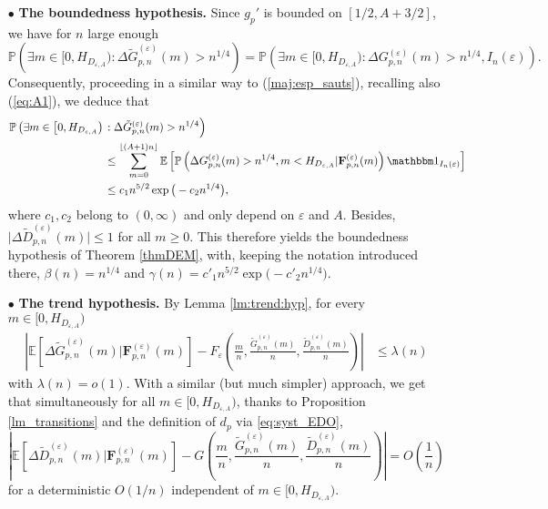 \documentclass[a4, 11pt]{article}
\numberwithin{equation}{section}
\theoremstyle{plain}
\theoremstyle{definition}
\theoremstyle{remark}
\begin{document}
	\begin{enumerate}[leftmargin=0.8cm, topsep=0cm]
			\item[$\bullet$] \textbf{The boundedness hypothesis.}
			Since $g_p'$ is bounded on $\left[1/2,A+3/2\right]$, we have for $n$ large enough
	\begin{equation*}
		\mathbb{P}\left(\exists m \in \big[0,H_{D_{\varepsilon,A}}\big):\Delta \tilde{G}^{(\varepsilon)}_{p,n}(m)>n^{1/4}   \right)=\mathbb{P}\left(\exists m \in \big[0,H_{D_{\varepsilon,A}}\big):\Delta G_{p,n}^{(\varepsilon)}(m)>n^{1/4},I_n(\varepsilon) \right).
	\end{equation*}
	Consequently, proceeding in a similar way to (\ref{maj:esp_sauts}), recalling also (\ref{eq:A1}), we deduce that
\begin{align*}
	\mathbb{P}\left(\exists m \in \big[0,H_{D_{\varepsilon,A}}\big)\right.&\Big.:\Delta \tilde{G}^{(\varepsilon)}_{p,n}(m)>n^{1/4}   \Big) \\
&\leq \sum_{m=0}^{\lfloor(A+1)n\rfloor}\mathbb{E}\left[\mathbb{P}\left(\Delta {G}^{(\varepsilon)}_{p,n}(m)>n^{1/4}, m < H_{D_{\varepsilon,A}}\vert {\mathbf{F}}^{(\varepsilon)}_{p,n}(m)\right)\mathbbm 1_{I_n(\varepsilon)}\right]\\
				&\leq  c_1n^{5/2}\exp\big(-c_2 n^{1/4}\big),
			\end{align*}
			where $c_1,c_2$ belong to $(0,\infty)$ and only depend on $\varepsilon$ and $A$. Besides, $\lvert \Delta \tilde{D}^{(\varepsilon)}_{p,n}(m)\rvert\leq 1$ for all $m\geq 0$. This therefore yields the boundedness hypothesis of Theorem \ref{thmDEM}, with, keeping the notation introduced there, $\beta(n)=n^{1/4}$ and $\gamma(n)=c'_1n^{5/2}\exp\big(-c'_2 n^{1/4}\big)$.
			\item[$\bullet$] \textbf{The trend hypothesis.} By Lemma \ref{lm:trend:hyp}, for every $m\in \big[0,H_{D_{\varepsilon,A}}\big)$
			\begin{align*}
	\left\vert\mathbb{E}\left[\Delta \tilde{G}^{(\varepsilon)}_{p,n}(m) | {\mathbf{F}}^{(\varepsilon)}_{p,n}(m)  \right] -F_{\varepsilon}\left(\frac{m}{n},\frac{\tilde{G}^{(\varepsilon)}_{p,n}(m)}{n},\frac{\tilde{D}^{(\varepsilon)}_{p,n}(m)}{n}\right)\right\vert
	&\leq \lambda(n)
	\end{align*} 
with $\lambda(n)=o(1)$. With a similar (but much simpler) approach,  we get that simultaneously for all $m\in \big[0,H_{D_{\varepsilon,A}}\big)$, thanks to Proposition \ref{lm_transitions} and the definition of $d_p$ via \eqref{eq:syst_EDO},
			$$\left\vert \mathbb{E}\left[\Delta \tilde{D}^{(\varepsilon)}_{p,n}(m) | {\mathbf{F}}^{(\varepsilon)}_{p,n}(m)  \right] -G\left(\frac{m}{n},\frac{\tilde{G}^{(\varepsilon)}_{p,n}(m)}{n},\frac{\tilde{D}^{(\varepsilon)}_{p,n}(m)}{n}\right) \right \vert= O\left(\frac{1}{n} \right)$$
for a deterministic $O(1/n)$ independent of $m\in \big[0,H_{D_{\varepsilon,A}}\big)$.			
		
		\end{enumerate}
\end{document}
